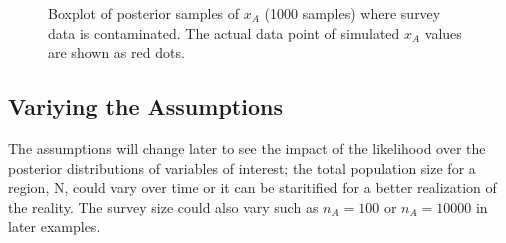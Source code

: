 \documentclass[12pt]{article}
\begin{document}
\begin{figure}[h]
	\centering
	\caption[two early result box plots:xa]{Boxplot of posterior samples of $x_A$ (1000 samples) where survey data is contaminated.  The actual data point of simulated $x_A$ values are shown as red dots.}
	\label{contam_xt}
\end{figure}

\subsection{Variying the Assumptions}
The assumptions will change later to see the impact of the likelihood over the posterior distributions of variables of interest; the total population size for a region, N, could vary over time or it can be staritified for a better realization of the reality. The survey size could also vary such as $n_{A}=100$ or $n_{A}=10000$ in later examples. 
 


\end{document}

